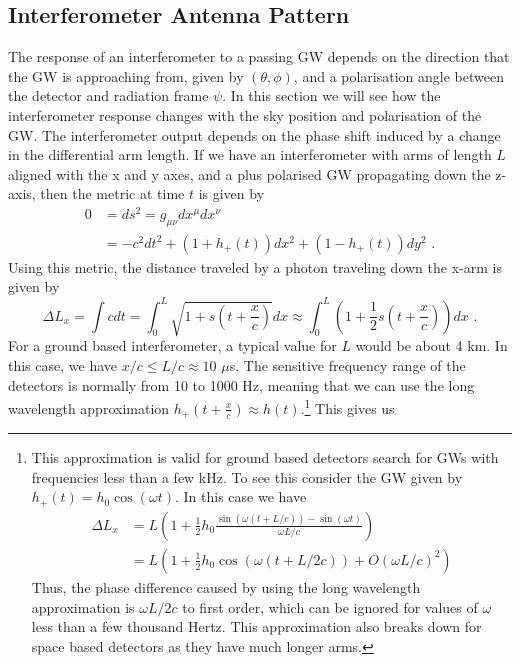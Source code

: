 \documentclass[11pt]{cuthesis}
\newcommand{\mn}{_{\mu\nu}}
\newcommand{\fs}{\text{ .}}
\begin{document}
\subsection{Interferometer Antenna Pattern} \label{sec:antenna pattern}
The response of an interferometer to a passing GW depends on the direction that the GW is approaching from, given by $(\theta,\phi)$, and a polarisation angle between the detector and radiation frame $\psi$. In this section we will see how the interferometer response changes with the sky position and polarisation of the GW. \cite{maggiore} The interferometer output depends on the phase shift induced by a change in the differential arm length. If we have an interferometer with arms of length $L$ aligned with the x and y axes, and a plus polarised GW propagating down the z-axis, then the metric at time $t$ is given by
\begin{equation} \label{ifo metric}
\begin{split}
0 & = ds^2 = g\mn dx^\mu dx^\nu \\
&= -c^2 dt^2 + (1+h_+ (t))dx^2 + (1-h_+ (t))dy^2 \fs
\end{split}
\end{equation}
Using this metric, the distance traveled by a photon traveling down the x-arm is given by
\begin{equation}
\Delta L_x = \int c dt = \int_0^L \sqrt{1 + s\left( t + \frac{x}{c} \right) } dx \approx  \int_0^L \left( 1 + \frac{1}{2} s\left( t + \frac{x}{c} \right) \right) dx \fs
\end{equation}
For a ground based interferometer, a typical value for $L$ would be about 4 km. In this case, we have $x/c \leq L/c \approx 10$ $\mu$s. The sensitive frequency range of the detectors is normally from 10 to 1000 Hz, meaning that we can use the long wavelength approximation $h_+(t+\frac{x}{c}) \approx h(t)$.\footnote{
This approximation is valid for ground based detectors search for GWs with frequencies less than a few kHz. To see this consider the GW given by $h_+(t)=h_0\cos(\omega t)$. In this case we have
\begin{equation}
\begin{split}
\Delta L_x & = L \left( 1 + \frac{1}{2} h_0 \frac{\sin(\omega (t +L/c)) - \sin(\omega t) }{\omega L/c} \right) \\
& = L \left( 1 + \frac{1}{2} h_0 \cos(\omega (t +L/2c)) + O\left(\omega L/c\right)^2 \right)
\end{split}
\end{equation}
Thus, the phase difference caused by using the long wavelength approximation is $\omega L/2c$ to first order, which can be ignored for values of $\omega$ less than a few thousand Hertz. This approximation also breaks down for space based detectors as they have much longer arms.
} This gives us 
\end{document}
